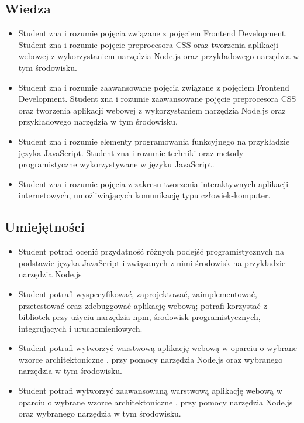 \documentclass[12pt, a4paper]{article}
\begin{document}
\subsection*{Wiedza}
\begin{itemize}
  \item Student zna i rozumie pojęcia związane z pojęciem Frontend Development. Student zna i rozumie pojęcie preprocesora CSS oraz tworzenia aplikacji webowej z wykorzystaniem narzędzia Node.js oraz przykładowego narzędzia w tym środowisku.
  \item Student zna i rozumie zaawansowane  pojęcia związane z pojęciem Frontend Development. Student zna i rozumie zaawansowane pojęcie preprocesora CSS oraz tworzenia aplikacji webowej z wykorzystaniem narzędzia Node.js oraz przykładowego narzędzia w tym środowisku.
  \item Student zna i rozumie elementy programowania funkcyjnego na przykładzie języka JavaScript. Student zna i rozumie techniki oraz metody programistyczne wykorzystywane w języku JavaScript.
  \item Student zna i rozumie pojęcia z zakresu tworzenia interaktywnych aplikacji internetowych, umożliwiających komunikację typu człowiek-komputer.
\end{itemize}

\subsection*{Umiejętności}
\begin{itemize}
  \item Student potrafi ocenić przydatność różnych podejść programistycznych na podstawie języka JavaScript i związanych z nimi środowisk na przykładzie narzędzia Node.js
  \item Student potrafi wyspecyfikować, zaprojektować, zaimplementować, przetestować oraz zdebuggować aplikację webową; potrafi korzystać z bibliotek przy użyciu narzędzia npm, środowisk programistycznych, integrujących i uruchomieniowych.
  \item Student potrafi wytworzyć warstwową aplikację webową w oparciu o wybrane wzorce architektoniczne , przy pomocy narzędzia Node.js oraz wybranego narzędzia w tym środowisku.
  \item Student potrafi wytworzyć zaawansowaną warstwową aplikację webową w oparciu o wybrane wzorce architektoniczne , przy pomocy narzędzia Node.js oraz wybranego narzędzia w tym środowisku.
\end{itemize}
\end{document}
